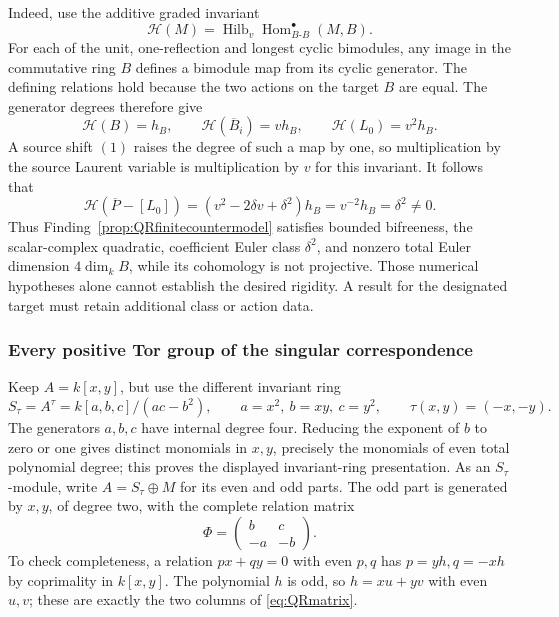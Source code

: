\documentclass[11pt,a4paper]{article}
\theoremstyle{named}\newtheorem{finding}{Finding}[section]
\theoremstyle{definition}\newtheorem{definition}[finding]{Definition}
\theoremstyle{remark}\newtheorem{remark}[finding]{Remark}
\begin{document}
Indeed, use the additive graded invariant
\[
 \mathcal H(M)=\operatorname{Hilb}_v
                  \operatorname{Hom}_{B\text{-}B}^{\bullet}(M,B).
\]
For each of the unit, one-reflection and longest
cyclic bimodules, any image in the commutative ring
\(B\) defines a bimodule map from its cyclic generator.
The defining relations hold because the two actions
on the target \(B\) are equal. The generator degrees
therefore give
\[
 \mathcal H(B)=h_B,
 \qquad\mathcal H(\overline B_i)=v h_B,
 \qquad\mathcal H(L_0)=v^2h_B.
\]
A source shift \((1)\) raises the degree of such a
map by one, so multiplication by the source Laurent
variable is multiplication by \(v\) for this invariant.
It follows that
\begin{equation}\label{eq:QRclassseparation}
 \mathcal H(\overline P-[L_0])
    =(v^2-2\delta v+\delta^2)h_B
    =v^{-2}h_B=\delta^2\ne0.
\end{equation}
Thus Finding~\ref{prop:QRfinitecountermodel}
satisfies bounded bifreeness, the scalar-complex
quadratic, coefficient Euler class \(\delta^2\),
and nonzero total Euler dimension \(4\dim_k B\),
while its cohomology is not projective.
Those numerical hypotheses alone cannot establish
the desired rigidity. A result for the designated
target must retain additional class or action data.

\subsubsection{Every positive Tor group of the singular correspondence}

Keep \(A=k[x,y]\), but use the different invariant ring
\begin{equation}\label{eq:QRsingularring}
 S_\tau=A^\tau=k[a,b,c]/(ac-b^2),
 \qquad a=x^2,\ b=xy,\ c=y^2,
 \qquad \tau(x,y)=(-x,-y).
\end{equation}
The generators \(a,b,c\) have internal degree four.
Reducing the exponent of \(b\) to zero or one
gives distinct monomials in \(x,y\), precisely the
monomials of even total polynomial degree; this
proves the displayed invariant-ring presentation.
As an \(S_\tau\)-module, write
\(A=S_\tau\oplus M\) for its even and odd parts.
The odd part is generated by \(x,y\), of degree two,
with the complete relation matrix
\begin{equation}\label{eq:QRmatrix}
            \Phi=\begin{pmatrix}b&c\\-a&-b\end{pmatrix}.
\end{equation}
To check completeness, a relation \(px+qy=0\)
with even \(p,q\) has \(p=yh,q=-xh\) by coprimality
in \(k[x,y]\). The polynomial \(h\) is odd, so
\(h=xu+yv\) with even \(u,v\); these are exactly
the two columns of \eqref{eq:QRmatrix}.
\end{document}
